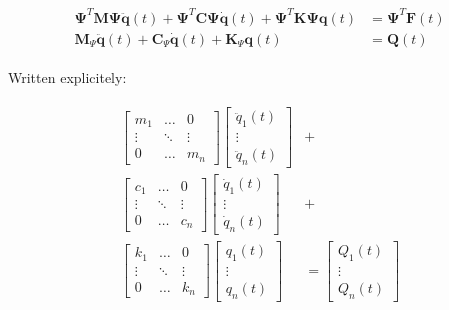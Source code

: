 \documentclass[10pt,b5paper,titlepage]{book}
\newenvironment{eqarray}
{
    \begin{eqnarray}
        \begin{aligned}
}
{
        \end{aligned}
    \end{eqnarray}
}
\begin{document}
\begin{eqarray}
    \mathbf{\Psi}^T \mathbf{M} \mathbf{\Psi} \ddot{\mathbf{q}}(t) +
    \mathbf{\Psi}^T \mathbf{C} \mathbf{\Psi} \dot{\mathbf{q}}(t) +
    \mathbf{\Psi}^T \mathbf{K} \mathbf{\Psi} \mathbf{q}(t) &=
    \mathbf{\Psi}^T \mathbf{F}(t) \\
    \mathbf{M}_{\Psi} \ddot{\mathbf{q}}(t) +
    \mathbf{C}_{\Psi} \dot{\mathbf{q}}(t) +
    \mathbf{K}_{\Psi} \mathbf{q}(t) &= \mathbf{Q}(t)
\end{eqarray}

Written explicitely:

\begin{eqarray}
    \begin{bmatrix}
        m_1 & \dots & 0 \\
        \vdots & \ddots & \vdots \\
        0 & \dots & m_n
    \end{bmatrix}
    \begin{bmatrix}
        \ddot{q}_1(t) \\
        \vdots \\
        \ddot{q}_n(t)
    \end{bmatrix} &+ \\
    \begin{bmatrix}
        c_1 & \dots & 0 \\
        \vdots & \ddots & \vdots \\
        0 & \dots & c_n
    \end{bmatrix}
    \begin{bmatrix}
        \dot{q}_1(t) \\
        \vdots \\
        \dot{q}_n(t)
    \end{bmatrix} &+ \\
    \begin{bmatrix}
        k_1 & \dots & 0 \\
        \vdots & \ddots & \vdots \\
        0 & \dots & k_n
    \end{bmatrix}
    \begin{bmatrix}
        q_1(t) \\
        \vdots \\
        q_n(t)
    \end{bmatrix} &=
    \begin{bmatrix}
        Q_1(t) \\
        \vdots \\
        Q_n(t)
    \end{bmatrix}
\end{eqarray}
\end{document}
